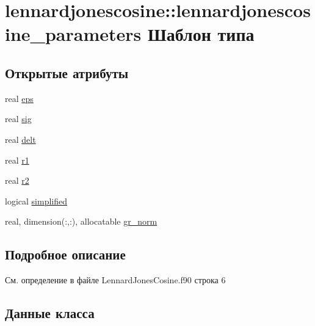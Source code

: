 \hypertarget{structlennardjonescosine_1_1lennardjonescosine__parameters}{}\section{lennardjonescosine\+:\+:lennardjonescosine\+\_\+parameters Шаблон типа}
\label{structlennardjonescosine_1_1lennardjonescosine__parameters}
\subsection*{Открытые атрибуты}
\begin{DoxyCompactItemize}
\item 
real \mbox{\hyperlink{structlennardjonescosine_1_1lennardjonescosine__parameters_a67283a0b8d3285df4b2ed35249dd1216}{eps}}
\item 
real \mbox{\hyperlink{structlennardjonescosine_1_1lennardjonescosine__parameters_a34b1ea46e5f728ef278ec147773181a0}{sig}}
\item 
real \mbox{\hyperlink{structlennardjonescosine_1_1lennardjonescosine__parameters_a2d26399d2ef18e2203ed7f10418462e1}{delt}}
\item 
real \mbox{\hyperlink{structlennardjonescosine_1_1lennardjonescosine__parameters_a495b335ea3d9df91dc3edc846dda41fe}{r1}}
\item 
real \mbox{\hyperlink{structlennardjonescosine_1_1lennardjonescosine__parameters_a383f9fb10078335e919d15b3191ea588}{r2}}
\item 
logical \mbox{\hyperlink{structlennardjonescosine_1_1lennardjonescosine__parameters_a87ce6c8b2238a6fe5ab9679c238b3746}{simplified}}
\item 
real, dimension(\+:,\+:), allocatable \mbox{\hyperlink{structlennardjonescosine_1_1lennardjonescosine__parameters_a4eb2bb7bdd06a8ed35f9d3093ea4410a}{gr\+\_\+norm}}
\end{DoxyCompactItemize}


\subsection{Подробное описание}


См. определение в файле Lennard\+Jones\+Cosine.\+f90 строка 6



\subsection{Данные класса}
\mbox{\label{structlennardjonescosine_1_1lennardjonescosine__parameters_a2d26399d2ef18e2203ed7f10418462e1}} 
